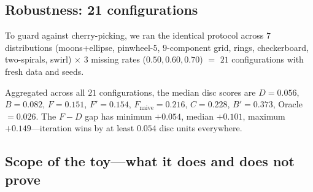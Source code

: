 \documentclass{article}
\theoremstyle{plain}
\theoremstyle{definition}
\theoremstyle{remark}
\begin{document}
\subsection{Robustness: 21 configurations}
\label{app:toy-robustness}

To guard against cherry-picking, we ran the identical protocol across $7$ distributions (moons+ellipse, pinwheel-$5$, $9$-component grid, rings, checkerboard, two-spirals, swirl) $\times$ $3$ missing rates ($0.50, 0.60, 0.70$) $=$ $21$ configurations with fresh data and seeds.

\begin{table}[h]
\centering
\caption{Robustness across $21$ configurations. Every pairwise claim in Findings $2$--$5$ is universal.}
\label{tab:toy-robustness}
\end{table}

Aggregated across all $21$ configurations, the median disc scores are $D = 0.056$, $B = 0.082$, $F = 0.151$, $F' = 0.154$, $F_{\mathrm{naive}} = 0.216$, $C = 0.228$, $B' = 0.373$, Oracle $= 0.026$. The $F - D$ gap has minimum $+0.054$, median $+0.101$, maximum $+0.149$---iteration wins by at least $0.054$ disc units everywhere.

\subsection{Scope of the toy---what it does and does not prove}
\end{document}
